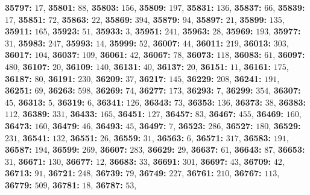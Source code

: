 \textsf{\bfseries 35797:} $17$, \textsf{\bfseries 35801:} $88$, \textsf{\bfseries 35803:} $156$, \textsf{\bfseries 35809:} $197$, \textsf{\bfseries 35831:} $136$, \textsf{\bfseries 35837:} $66$, \textsf{\bfseries 35839:} $17$, \textsf{\bfseries 35851:} $72$, \textsf{\bfseries 35863:} $22$, \textsf{\bfseries 35869:} $394$, \textsf{\bfseries 35879:} $94$, \textsf{\bfseries 35897:} $21$, \textsf{\bfseries 35899:} $135$, \textsf{\bfseries 35911:} $165$, \textsf{\bfseries 35923:} $51$, \textsf{\bfseries 35933:} $3$, \textsf{\bfseries 35951:} $241$, \textsf{\bfseries 35963:} $28$, \textsf{\bfseries 35969:} $193$, \textsf{\bfseries 35977:} $31$, \textsf{\bfseries 35983:} $247$, \textsf{\bfseries 35993:} $14$, \textsf{\bfseries 35999:} $52$, \textsf{\bfseries 36007:} $44$, \textsf{\bfseries 36011:} $219$, \textsf{\bfseries 36013:} $303$, \textsf{\bfseries 36017:} $104$, \textsf{\bfseries 36037:} $109$, \textsf{\bfseries 36061:} $42$, \textsf{\bfseries 36067:} $78$, \textsf{\bfseries 36073:} $118$, \textsf{\bfseries 36083:} $61$, \textsf{\bfseries 36097:} $480$, \textsf{\bfseries 36107:} $20$, \textsf{\bfseries 36109:} $140$, \textsf{\bfseries 36131:} $40$, \textsf{\bfseries 36137:} $20$, \textsf{\bfseries 36151:} $11$, \textsf{\bfseries 36161:} $175$, \textsf{\bfseries 36187:} $80$, \textsf{\bfseries 36191:} $230$, \textsf{\bfseries 36209:} $37$, \textsf{\bfseries 36217:} $145$, \textsf{\bfseries 36229:} $208$, \textsf{\bfseries 36241:} $191$, \textsf{\bfseries 36251:} $69$, \textsf{\bfseries 36263:} $598$, \textsf{\bfseries 36269:} $74$, \textsf{\bfseries 36277:} $173$, \textsf{\bfseries 36293:} $7$, \textsf{\bfseries 36299:} $354$, \textsf{\bfseries 36307:} $45$, \textsf{\bfseries 36313:} $5$, \textsf{\bfseries 36319:} $6$, \textsf{\bfseries 36341:} $126$, \textsf{\bfseries 36343:} $73$, \textsf{\bfseries 36353:} $136$, \textsf{\bfseries 36373:} $38$, \textsf{\bfseries 36383:} $112$, \textsf{\bfseries 36389:} $331$, \textsf{\bfseries 36433:} $165$, \textsf{\bfseries 36451:} $127$, \textsf{\bfseries 36457:} $83$, \textsf{\bfseries 36467:} $455$, \textsf{\bfseries 36469:} $160$, \textsf{\bfseries 36473:} $160$, \textsf{\bfseries 36479:} $46$, \textsf{\bfseries 36493:} $45$, \textsf{\bfseries 36497:} $7$, \textsf{\bfseries 36523:} $286$, \textsf{\bfseries 36527:} $180$, \textsf{\bfseries 36529:} $231$, \textsf{\bfseries 36541:} $132$, \textsf{\bfseries 36551:} $26$, \textsf{\bfseries 36559:} $31$, \textsf{\bfseries 36563:} $6$, \textsf{\bfseries 36571:} $317$, \textsf{\bfseries 36583:} $191$, \textsf{\bfseries 36587:} $194$, \textsf{\bfseries 36599:} $269$, \textsf{\bfseries 36607:} $283$, \textsf{\bfseries 36629:} $29$, \textsf{\bfseries 36637:} $61$, \textsf{\bfseries 36643:} $87$, \textsf{\bfseries 36653:} $31$, \textsf{\bfseries 36671:} $130$, \textsf{\bfseries 36677:} $12$, \textsf{\bfseries 36683:} $33$, \textsf{\bfseries 36691:} $301$, \textsf{\bfseries 36697:} $43$, \textsf{\bfseries 36709:} $42$, \textsf{\bfseries 36713:} $91$, \textsf{\bfseries 36721:} $248$, \textsf{\bfseries 36739:} $79$, \textsf{\bfseries 36749:} $227$, \textsf{\bfseries 36761:} $210$, \textsf{\bfseries 36767:} $113$, \textsf{\bfseries 36779:} $509$, \textsf{\bfseries 36781:} $18$, \textsf{\bfseries 36787:} $53$, 
